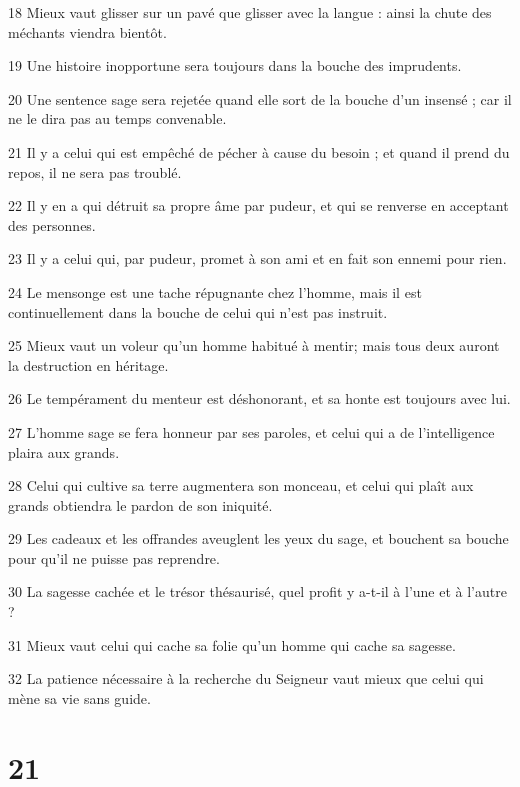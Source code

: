 \par 18 Mieux vaut glisser sur un pavé que glisser avec la langue : ainsi la chute des méchants viendra bientôt.
\par 19 Une histoire inopportune sera toujours dans la bouche des imprudents.
\par 20 Une sentence sage sera rejetée quand elle sort de la bouche d'un insensé ; car il ne le dira pas au temps convenable.
\par 21 Il y a celui qui est empêché de pécher à cause du besoin ; et quand il prend du repos, il ne sera pas troublé.
\par 22 Il y en a qui détruit sa propre âme par pudeur, et qui se renverse en acceptant des personnes.
\par 23 Il y a celui qui, par pudeur, promet à son ami et en fait son ennemi pour rien.
\par 24 Le mensonge est une tache répugnante chez l'homme, mais il est continuellement dans la bouche de celui qui n'est pas instruit.
\par 25 Mieux vaut un voleur qu'un homme habitué à mentir; mais tous deux auront la destruction en héritage.
\par 26 Le tempérament du menteur est déshonorant, et sa honte est toujours avec lui.
\par 27 L'homme sage se fera honneur par ses paroles, et celui qui a de l'intelligence plaira aux grands.
\par 28 Celui qui cultive sa terre augmentera son monceau, et celui qui plaît aux grands obtiendra le pardon de son iniquité.
\par 29 Les cadeaux et les offrandes aveuglent les yeux du sage, et bouchent sa bouche pour qu'il ne puisse pas reprendre.
\par 30 La sagesse cachée et le trésor thésaurisé, quel profit y a-t-il à l'une et à l'autre ?
\par 31 Mieux vaut celui qui cache sa folie qu'un homme qui cache sa sagesse.
\par 32 La patience nécessaire à la recherche du Seigneur vaut mieux que celui qui mène sa vie sans guide.

\chapter{21}

